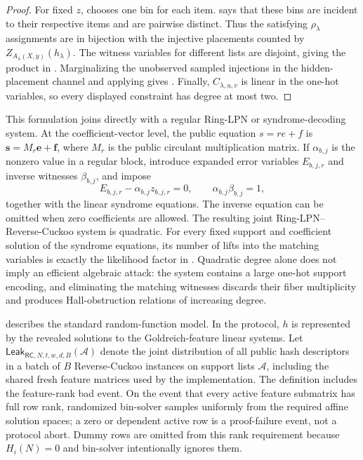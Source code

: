 \begin{proof}
For fixed $z$,  chooses one bin for each
item.   says that these bins are incident
to their respective items and are pairwise distinct.  Thus the satisfying
$\rho_\lambda$ assignments are in bijection with the injective placements
counted by $Z_{A_\lambda(X,y)}(h_\lambda)$.  The witness variables for
different lists are disjoint, giving the product in
.  Marginalizing the unobserved sampled
injections in the hidden-placement channel and applying
 gives
.  Finally,
$C_{\lambda,u,v}$ is linear in the one-hot variables, so every displayed
constraint has degree at most two.
\end{proof}

This formulation joins directly with a regular Ring-LPN or syndrome-decoding
system.  At the coefficient-vector level, the public equation $s=re+f$ is
$\boldsymbol{s}=M_r\boldsymbol{e}+\boldsymbol{f}$, where $M_r$ is the public
circulant multiplication matrix.  If $\alpha_{b,j}$ is the nonzero value in a
regular block, introduce expanded error variables $E_{b,j,r}$ and inverse
witnesses $\beta_{b,j}$, and impose
\[
 E_{b,j,r}-\alpha_{b,j}z_{b,j,r}=0,
 \qquad
 \alpha_{b,j}\beta_{b,j}=1,
 \tag{RC-LPN}
\]
together with the linear syndrome equations.  The inverse equation can be
omitted when zero coefficients are allowed.  The resulting joint
Ring-LPN--Reverse-Cuckoo system is quadratic.  For every fixed support and
coefficient solution of the syndrome equations, its number of lifts into the
matching variables is exactly the likelihood factor in
.  Quadratic degree alone does not imply
an efficient algebraic attack: the system contains a large one-hot support
encoding, and eliminating the matching witnesses discards their fiber
multiplicity and produces Hall-obstruction relations of increasing degree.

 describes the standard random-function
model.  In the protocol, $h$ is represented by the revealed solutions to the
Goldreich-feature linear systems.  Let
$\mathsf{Leak}_{\mathsf{RC},N,t,w,d,B}(\mathcal A)$ denote the joint distribution of all public
hash descriptors in a batch of $B$ Reverse-Cuckoo instances on support lists
$\mathcal A$, including the shared fresh feature matrices used by the
implementation.  The definition includes the feature-rank bad event.  On the
event that every active feature submatrix has full row rank, randomized
\textsf{bin-solver} samples uniformly from the required affine solution
spaces; a zero or dependent active row is a proof-failure event, not a
protocol abort.  Dummy rows are omitted from this rank requirement because
$H_i(N)=0$ and \textsf{bin-solver} intentionally ignores them.

